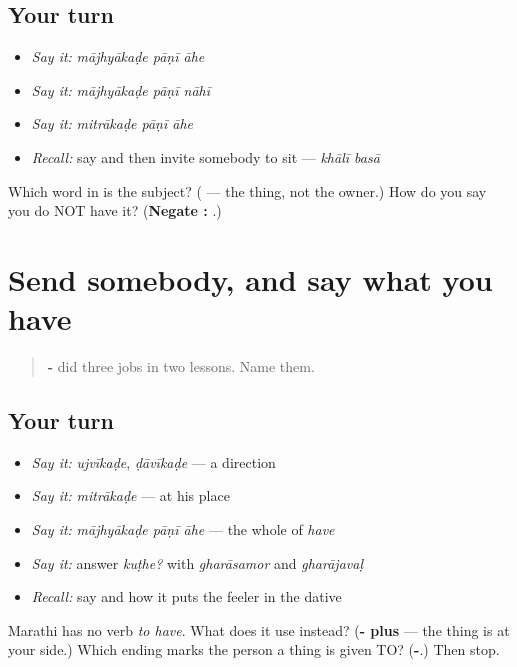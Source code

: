 \subsection*{Your turn}
\begin{itemize}
\raggedright
  \item \emph{Say it:} \emph{mājhyākaḍe pāṇī āhe}
  \item \emph{Say it:} \emph{mājhyākaḍe pāṇī nāhī}
  \item \emph{Say it:} \emph{mitrākaḍe pāṇī āhe}
  \item \emph{Recall:} say \textbf{} and then invite somebody to sit — \emph{khālī basā}
\end{itemize}

\begin{tcolorbox}[breakable,colback=teal!4,colframe=teal!35!black,title={Before you move on}]
Which word in \textbf{  } is the subject? (\textbf{} — the thing, not the owner.) How do you say you do NOT have it? (\textbf{Negate : }.)
\end{tcolorbox}
\section[\texorpdfstring{-\mr{कडे} (-kaḍe)}{-कडे (-kaḍe)}]{Send somebody, and say what you have}

\label{lesson:MR-R48-have-and-toward}



\begin{quote}
\textbf{-} did three jobs in two lessons. Name them.
\end{quote}

\subsection*{Your turn}
\begin{itemize}
\raggedright
  \item \emph{Say it:} \emph{ujvīkaḍe}, \emph{ḍāvīkaḍe} — a direction
  \item \emph{Say it:} \emph{mitrākaḍe} — at his place
  \item \emph{Say it:} \emph{mājhyākaḍe pāṇī āhe} — the whole of \emph{have}
  \item \emph{Say it:} answer \emph{kuṭhe?} with \emph{gharāsamor} and \emph{gharājavaḷ}
  \item \emph{Recall:} say \textbf{} and how it puts the feeler in the dative
\end{itemize}

\begin{tcolorbox}[breakable,colback=teal!4,colframe=teal!35!black,title={Before you move on}]
Marathi has no verb \emph{to have}. What does it use instead? (\textbf{- plus } — the thing is at your side.) Which ending marks the person a thing is given TO? (\textbf{-}.) Then stop.
\end{tcolorbox}
